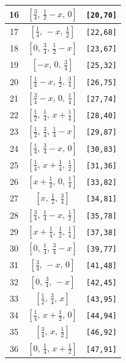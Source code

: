 \documentclass[fleqn,8pt]{jsarticle}
\begin{document}
\begin{longtable}{ccc}
16 & $\left[ \frac{3}{4},\, \frac{1}{2} - x,\, 0 \right]$ & {\tt [20,70]} \\ \hline
17 & $\left[ \frac{1}{4},\, - x,\, \frac{1}{2} \right]$ & {\tt [22,68]} \\ \hline
18 & $\left[ 0,\, \frac{3}{4},\, \frac{1}{2} - x \right]$ & {\tt [23,67]} \\ \hline
19 & $\left[ - x,\, 0,\, \frac{3}{4} \right]$ & {\tt [25,32]} \\ \hline
20 & $\left[ \frac{1}{4} - x,\, \frac{1}{2},\, \frac{3}{4} \right]$ & {\tt [26,75]} \\ \hline
21 & $\left[ \frac{3}{4} - x,\, 0,\, \frac{1}{4} \right]$ & {\tt [27,74]} \\ \hline
22 & $\left[ \frac{1}{2},\, \frac{1}{4},\, x + \frac{1}{4} \right]$ & {\tt [28,40]} \\ \hline
23 & $\left[ \frac{1}{2},\, \frac{3}{4},\, \frac{1}{4} - x \right]$ & {\tt [29,87]} \\ \hline
24 & $\left[ \frac{1}{4},\, \frac{3}{4} - x,\, 0 \right]$ & {\tt [30,83]} \\ \hline
25 & $\left[ \frac{1}{4},\, x + \frac{1}{4},\, \frac{1}{2} \right]$ & {\tt [31,36]} \\ \hline
26 & $\left[ x + \frac{1}{2},\, 0,\, \frac{1}{4} \right]$ & {\tt [33,82]} \\ \hline
27 & $\left[ x,\, \frac{1}{2},\, \frac{3}{4} \right]$ & {\tt [34,81]} \\ \hline
28 & $\left[ \frac{3}{4},\, \frac{1}{4} - x,\, \frac{1}{2} \right]$ & {\tt [35,78]} \\ \hline
29 & $\left[ x + \frac{1}{4},\, \frac{1}{2},\, \frac{1}{4} \right]$ & {\tt [37,38]} \\ \hline
30 & $\left[ 0,\, \frac{1}{4},\, \frac{3}{4} - x \right]$ & {\tt [39,77]} \\ \hline
31 & $\left[ \frac{3}{4},\, - x,\, 0 \right]$ & {\tt [41,48]} \\ \hline
32 & $\left[ 0,\, \frac{3}{4},\, - x \right]$ & {\tt [42,45]} \\ \hline
33 & $\left[ \frac{1}{2},\, \frac{3}{4},\, x \right]$ & {\tt [43,95]} \\ \hline
34 & $\left[ \frac{1}{4},\, x + \frac{1}{2},\, 0 \right]$ & {\tt [44,94]} \\ \hline
35 & $\left[ \frac{3}{4},\, x,\, \frac{1}{2} \right]$ & {\tt [46,92]} \\ \hline
36 & $\left[ 0,\, \frac{1}{4},\, x + \frac{1}{2} \right]$ & {\tt [47,91]} \\ \hline

\end{longtable}
\end{document}
